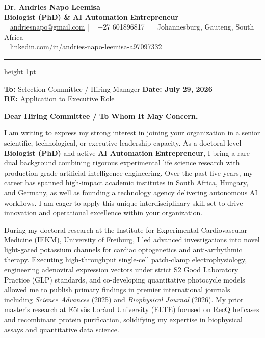 \documentclass[11pt,a4paper]{article}
\begin{document}
\begin{center}
    {\Huge \textbf{\color{primary} Dr. Andries Napo Leemisa}} \\[4pt]
    {\large \textbf{\color{secondary} Biologist (PhD) \& AI Automation Entrepreneur}} \\[6pt]
    \small
    \faEnvelope~ \href{mailto:andriesnapo@gmail.com}{andriesnapo@gmail.com} \quad|\quad
    \faPhone~ +27 601896817 \quad|\quad
    \faMapMarkerAlt~ Johannesburg, Gauteng, South Africa \\[3pt]
    \faLinkedin~ \href{https://linkedin.com/in/andries-napo-leemisa-a97097332}{linkedin.com/in/andries-napo-leemisa-a97097332}
\end{center}
\vspace{-8pt}
\hrule height 1pt \color{primary}
\vspace{12pt}

\noindent
\textbf{To:} Selection Committee / Hiring Manager \hfill \textbf{\color{textgray} Date: July 29, 2026} \\
\textbf{RE:} Application to Executive Role
\vspace{12pt}

\noindent
\textbf{Dear Hiring Committee / To Whom It May Concern,}
\vspace{8pt}

\setlength{\parindent}{0pt}
\setlength{\parskip}{8pt}

I am writing to express my strong interest in joining your organization in a senior scientific, technological, or executive leadership capacity. As a doctoral-level \textbf{Biologist (PhD)} and active \textbf{AI Automation Entrepreneur}, I bring a rare dual background combining rigorous experimental life science research with production-grade artificial intelligence engineering. Over the past five years, my career has spanned high-impact academic institutes in South Africa, Hungary, and Germany, as well as founding a technology agency delivering autonomous AI workflows. I am eager to apply this unique interdisciplinary skill set to drive innovation and operational excellence within your organization.

During my doctoral research at the Institute for Experimental Cardiovascular Medicine (IEKM), University of Freiburg, I led advanced investigations into novel light-gated potassium channels for cardiac optogenetics and anti-arrhythmic therapy. Executing high-throughput single-cell patch-clamp electrophysiology, engineering adenoviral expression vectors under strict S2 Good Laboratory Practice (GLP) standards, and co-developing quantitative photocycle models allowed me to publish primary findings in premier international journals including \textit{Science Advances} (2025) and \textit{Biophysical Journal} (2026). My prior master’s research at Eötvös Loránd University (ELTE) focused on RecQ helicases and recombinant protein purification, solidifying my expertise in biophysical assays and quantitative data science.
\end{document}
